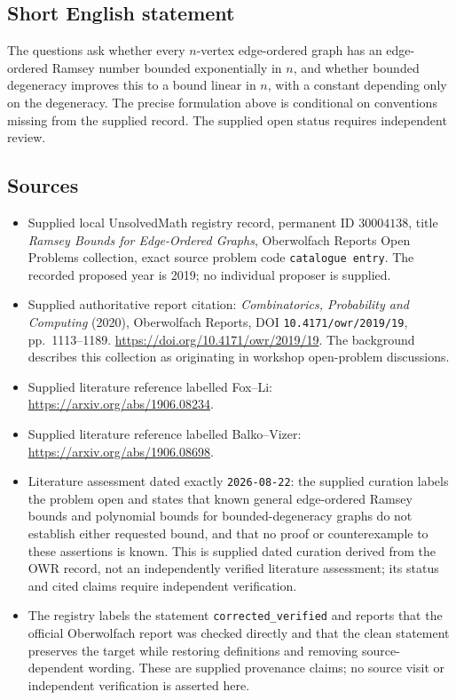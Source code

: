 \documentclass[11pt]{article}
\begin{document}
\subsection{Short English statement}
The questions ask whether every \(n\)-vertex edge-ordered graph has an edge-ordered Ramsey number bounded exponentially in \(n\), and whether bounded degeneracy improves this to a bound linear in \(n\), with a constant depending only on the degeneracy. The precise formulation above is conditional on conventions missing from the supplied record. The supplied open status requires independent review.
\subsection{Sources}
\begin{itemize}
\item Supplied local UnsolvedMath registry record, permanent ID \(30004138\), title \emph{Ramsey Bounds for Edge-Ordered Graphs}, Oberwolfach Reports Open Problems collection, exact source problem code \texttt{catalogue entry}. The recorded proposed year is 2019; no individual proposer is supplied.
\item Supplied authoritative report citation: \emph{Combinatorics, Probability and Computing} (2020), Oberwolfach Reports, DOI \texttt{10.4171/owr/2019/19}, pp.\ 1113--1189. \url{https://doi.org/10.4171/owr/2019/19}. The background describes this collection as originating in workshop open-problem discussions.
\item Supplied literature reference labelled Fox--Li: \url{https://arxiv.org/abs/1906.08234}.
\item Supplied literature reference labelled Balko--Vizer: \url{https://arxiv.org/abs/1906.08698}.
\item Literature assessment dated exactly \texttt{2026-08-22}: the supplied curation labels the problem open and states that known general edge-ordered Ramsey bounds and polynomial bounds for bounded-degeneracy graphs do not establish either requested bound, and that no proof or counterexample to these assertions is known. This is supplied dated curation derived from the OWR record, not an independently verified literature assessment; its status and cited claims require independent verification.
\item The registry labels the statement \texttt{corrected\_verified} and reports that the official Oberwolfach report was checked directly and that the clean statement preserves the target while restoring definitions and removing source-dependent wording. These are supplied provenance claims; no source visit or independent verification is asserted here.
\end{itemize}
\end{document}

